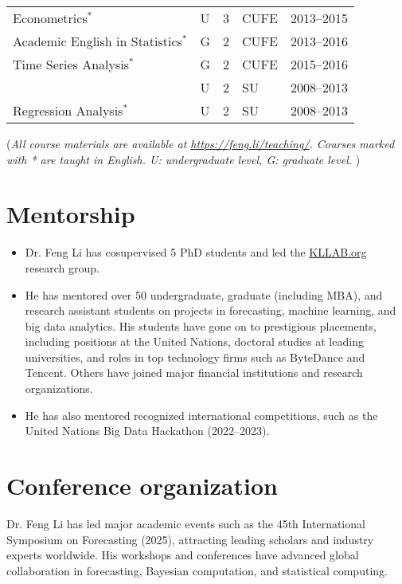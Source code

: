 \documentclass[twoside,a4paper]{article}
\begin{document}
\begin{center}
\begin{tabular}{p{7.5cm}llll}
    Econometrics$^*$                      & U          & 3      & CUFE  & 2013--2015 \\
    Academic English in Statistics$^*$    & G          & 2      & CUFE  & 2013--2016 \\
    Time Series Analysis$^*$              & G          & 2      & CUFE  & 2015--2016 \\
                                          & U          & 2      & SU    & 2008--2013 \\
    Regression Analysis$^*$               & U          & 2      & SU    & 2008--2013 \\
    \bottomrule
  \end{tabular}
\end{center}

{\footnotesize (\emph{All course materials are available at
    \emph{\url{https://feng.li/teaching/}}. Courses marked with * are taught in English. U: undergraduate level, G: graduate level. })}


\section{Mentorship}

\begin{itemize}
\item Dr. Feng Li has cosupervised 5 PhD students and led the \href{https://kllab.org}{KLLAB.org} research group.

\item He has mentored over 50 undergraduate, graduate (including MBA), and research assistant students on projects in forecasting, machine learning, and big data analytics. His students have gone on to prestigious placements, including positions at the United Nations, doctoral studies at leading universities, and roles in top technology firms such as ByteDance and Tencent. Others have joined major financial institutions and research organizations.

\item He has also mentored recognized international competitions, such as the United Nations Big Data Hackathon (2022--2023).

\end{itemize}

\section{Conference organization}

Dr. Feng Li has led major academic events such as the 45th International Symposium on Forecasting (2025), attracting leading scholars and industry experts worldwide. His workshops and conferences have advanced global collaboration in forecasting, Bayesian computation, and statistical computing.
\end{document}
